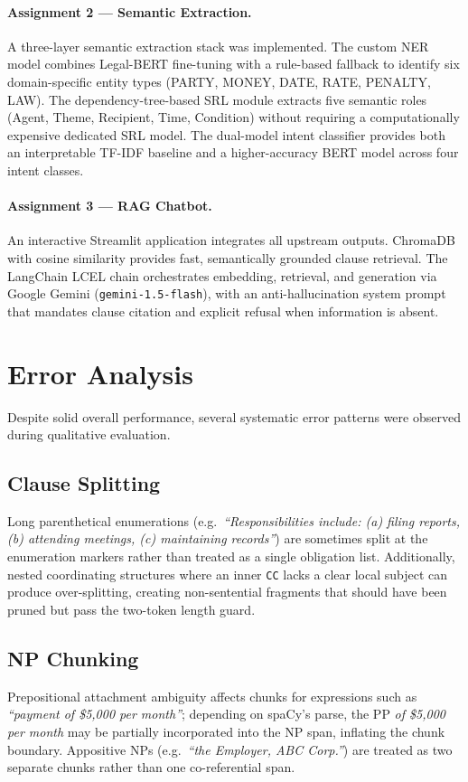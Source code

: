 \documentclass[12pt,a4paper]{report}
\begin{document}
\paragraph{Assignment 2 — Semantic Extraction.}
A three-layer semantic extraction stack was implemented.  The custom NER model
combines Legal-BERT fine-tuning with a rule-based fallback to identify six
domain-specific entity types (PARTY, MONEY, DATE, RATE, PENALTY, LAW).  The
dependency-tree-based SRL module extracts five semantic roles (Agent, Theme,
Recipient, Time, Condition) without requiring a computationally expensive dedicated
SRL model.  The dual-model intent classifier provides both an interpretable
TF-IDF baseline and a higher-accuracy BERT model across four intent classes.

\paragraph{Assignment 3 — RAG Chatbot.}
An interactive Streamlit application integrates all upstream outputs.  ChromaDB
with cosine similarity provides fast, semantically grounded clause retrieval.  The
LangChain LCEL chain orchestrates embedding, retrieval, and generation via Google
Gemini (\texttt{gemini-1.5-flash}), with an anti-hallucination system prompt that
mandates clause citation and explicit refusal when information is absent.

\section{Error Analysis}
\label{sec:error-analysis}

Despite solid overall performance, several systematic error patterns were observed
during qualitative evaluation.

\subsection*{Clause Splitting}
Long parenthetical enumerations (e.g.\ \textit{``Responsibilities include: (a)
filing reports, (b) attending meetings, (c) maintaining records''}) are sometimes
split at the enumeration markers rather than treated as a single obligation list.
Additionally, nested coordinating structures where an inner \texttt{CC} lacks a
clear local subject can produce over-splitting, creating non-sentential fragments
that should have been pruned but pass the two-token length guard.

\subsection*{NP Chunking}
Prepositional attachment ambiguity affects chunks for expressions such as
\textit{``payment of \$5,000 per month''}; depending on spaCy's parse, the PP
\textit{of \$5,000 per month} may be partially incorporated into the NP span,
inflating the chunk boundary.  Appositive NPs (e.g.\ \textit{``the Employer,
ABC Corp.''}) are treated as two separate chunks rather than one co-referential
span.
\end{document}
